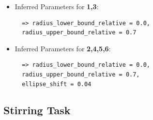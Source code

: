 \begin{itemize}
\item Inferred Parameters for \textbf{1,3}: 
 \begin{lstlisting}
  => radius_lower_bound_relative = 0.0, 
  radius_upper_bound_relative = 0.7
\end{lstlisting}
\item Inferred Parameters for \textbf{2,4,5,6}:
\begin{lstlisting}
  => radius_lower_bound_relative = 0.0, 
  radius_upper_bound_relative = 0.7,
  ellipse_shift = 0.04
\end{lstlisting}
\end{itemize}

\subsection*{Stirring Task}

